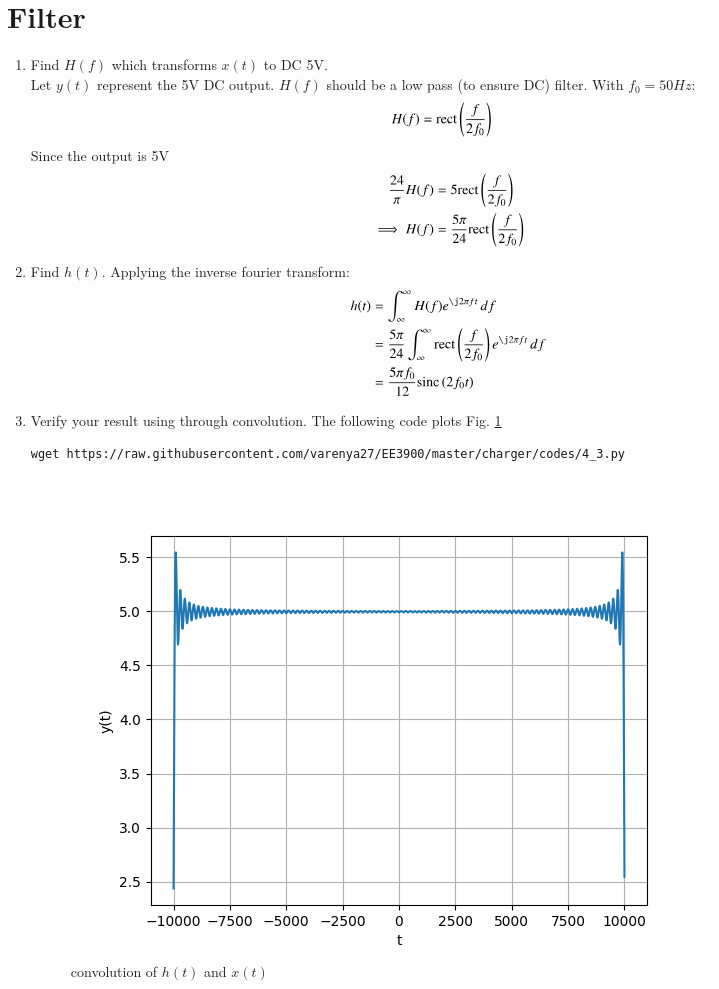 \documentclass[journal,12pt,twocolumn]{IEEEtran}
\renewcommand\thesection{\arabic{section}}
\begin{document}
\section{Filter}
\begin{enumerate}[label=\thesection.\arabic*
,ref=\thesection.\theenumi]
\item Find $H(f)$ which transforms $x(t)$ to DC 5V.\\\solution Let $y(t)$ represent the 5V DC output. $H(f)$ should be a low pass (to ensure DC) filter. With $f_0 = 50Hz$:
\begin{align}
    H(f) &= \text{rect}\left(\frac{f}{2f_0}\right)
\end{align}
Since the output is 5V
\begin{align}
    \frac{24}{\pi}H(f) &= 5\text{rect}\left(\frac{f}{2f_0}\right)\\
    \implies H(f)&= \frac{5\pi}{24}\text{rect}\left(\frac{f}{2f_0}\right)
\end{align}
\item Find $h(t)$.
Applying the inverse fourier transform:
\begin{align}
    h(t) &= \int_\infty^\infty H(f)e^{\j2\pi ft}\,df\\
    &= \frac{5\pi}{24}\int_\infty^\infty \rect{\frac{f}{2f_0}}e^{\j2\pi ft}\,df\\
    &= \frac{5\pi f_0}{12}\sinc{2f_0t}
\end{align}
\item Verify your result using  through convolution.
  The following code plots Fig. \ref{fig:conv-ft}
	\begin{lstlisting}
wget https://raw.githubusercontent.com/varenya27/EE3900/master/charger/codes/4_3.py
\end{lstlisting}
	\begin{figure}[h!]
	    \centering
	    \includegraphics[width=\columnwidth]{figures/conv-hx.png}
	    \caption{convolution of $h(t)$ and $x(t)$ }
	    \label{fig:conv-ft}
	\end{figure}

\end{enumerate}
\end{document}
